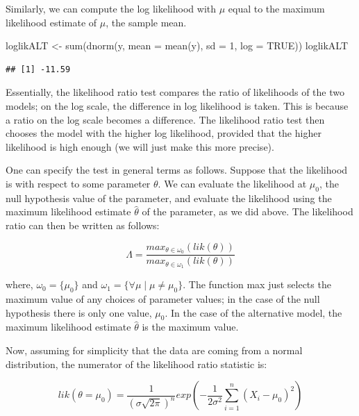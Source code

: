 \documentclass[
  12pt,
]{krantz}
\newenvironment{Shaded}{\begin{snugshade}}{\end{snugshade}}
\newcommand{\AttributeTok}[1]{\textcolor[rgb]{0.77,0.63,0.00}{#1}}
\newcommand{\ConstantTok}[1]{\textcolor[rgb]{0.00,0.00,0.00}{#1}}
\newcommand{\DecValTok}[1]{\textcolor[rgb]{0.00,0.00,0.81}{#1}}
\newcommand{\FunctionTok}[1]{\textcolor[rgb]{0.00,0.00,0.00}{#1}}
\newcommand{\NormalTok}[1]{#1}
\newcommand{\OtherTok}[1]{\textcolor[rgb]{0.56,0.35,0.01}{#1}}
\theoremstyle{definition}
\theoremstyle{definition}
\theoremstyle{definition}
\theoremstyle{definition}
\theoremstyle{remark}
\begin{document}
Similarly, we can compute the log likelihood with \(\mu\) equal to the maximum likelihood estimate of \(\mu\), the sample mean.

\begin{Shaded}
\begin{Highlighting}[]
\NormalTok{loglikALT }\OtherTok{\textless{}{-}} \FunctionTok{sum}\NormalTok{(}\FunctionTok{dnorm}\NormalTok{(y, }\AttributeTok{mean =} \FunctionTok{mean}\NormalTok{(y), }\AttributeTok{sd =} \DecValTok{1}\NormalTok{, }\AttributeTok{log =} \ConstantTok{TRUE}\NormalTok{))}
\NormalTok{loglikALT}
\end{Highlighting}
\end{Shaded}

\begin{verbatim}
## [1] -11.59
\end{verbatim}

Essentially, the likelihood ratio test compares the ratio of likelihoods of the two models; on the log scale, the difference in log likelihood is taken. This is because a ratio on the log scale becomes a difference. The likelihood ratio test then chooses the model with the higher log likelihood, provided that the higher likelihood is high enough (we will just make this more precise).

One can specify the test in general terms as follows. Suppose that the likelihood is with respect to some parameter \(\theta\). We can evaluate the likelihood at \(\mu_0\), the null hypothesis value of the parameter, and evaluate the likelihood using the maximum likelihood estimate \(\hat\theta\) of the parameter, as we did above. The likelihood ratio can then be written as follows:

\begin{equation}
\Lambda = \frac{max_{\theta\in \omega_0}(lik(\theta))}{max_{\theta\in \omega_1}(lik(\theta))}
\end{equation}

where, \(\omega_0=\{\mu_0\}\) and \(\omega_1=\{\forall \mu \mid \mu\neq \mu_0\}\). The function max just selects the maximum value of any choices of parameter values; in the case of the null hypothesis there is only one value, \(\mu_0\). In the case of the alternative model, the maximum likelihood estimate \(\hat\theta\) is the maximum value.

Now, assuming for simplicity that the data are coming from a normal distribution, the numerator of the likelihood ratio statistic is:

\begin{equation}
lik(\theta=\mu_0) = \frac{1}{(\sigma\sqrt{2\pi})^n} 
           exp\left( -\frac{1}{2\sigma^2} \sum_{i=1}^n (X_i - \mu_0)^2  \right)
\end{equation}
\end{document}
